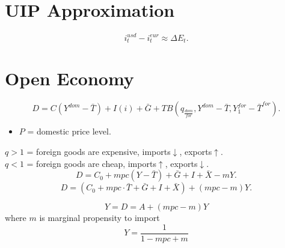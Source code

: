 \documentclass[a4paper, 11pt]{article}
\begin{document}
\section{UIP Approximation}
\[
i_t^{usd} - i_t^{eur} \approx \Delta E_t.
\]

\section{Open Economy}
\[
D=C(Y^{dom}-\bar{T}) + I(i) + \bar{G} + TB(q_{\frac{dom}{for}}, Y^{dom}-\bar{T}, Y_1^{for} - \bar{T}^{for}).
\]
\begin{itemize}
    \item $P$ = domestic price level.
\end{itemize}
$q > 1$ = foreign goods are expensive, imports$\downarrow$, exports$\uparrow$. \\
$q < 1$ = foreign goods are cheap, imports$\uparrow$, exports$\downarrow$. \\

\[
D = C_0+ mpc (Y-\bar{T}) + \bar{G} + I +\bar{X} - mY.
\]
\[
D = (C_0+ mpc \cdot \bar{T} + \bar{G} + I +\bar{X}) + (mpc - m)Y.
\]

\[
Y = D = A + (mpc - m)Y
\]
where $m$ is marginal propensity to import
\[
Y = \frac{1}{1 - mpc + m}
\]
\end{document}
